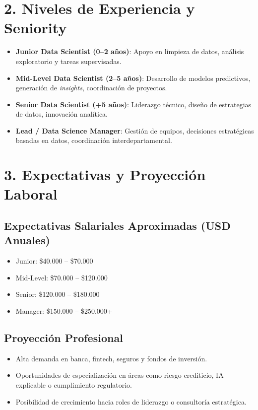 \documentclass[12pt]{article}
\begin{document}
\section*{2. Niveles de Experiencia y Seniority}

\begin{itemize}
    \item \textbf{Junior Data Scientist (0--2 años)}: Apoyo en limpieza de datos, análisis exploratorio y tareas supervisadas.
    \item \textbf{Mid-Level Data Scientist (2--5 años)}: Desarrollo de modelos predictivos, generación de \textit{insights}, coordinación de proyectos.
    \item \textbf{Senior Data Scientist (+5 años)}: Liderazgo técnico, diseño de estrategias de datos, innovación analítica.
    \item \textbf{Lead / Data Science Manager}: Gestión de equipos, decisiones estratégicas basadas en datos, coordinación interdepartamental.
\end{itemize}

\section*{3. Expectativas y Proyección Laboral}

\subsection*{Expectativas Salariales Aproximadas (USD Anuales)}
\begin{itemize}
    \item Junior: \$40.000 -- \$70.000
    \item Mid-Level: \$70.000 -- \$120.000
    \item Senior: \$120.000 -- \$180.000
    \item Manager: \$150.000 -- \$250.000+
\end{itemize}

\subsection*{Proyección Profesional}
\begin{itemize}
    \item Alta demanda en banca, fintech, seguros y fondos de inversión.
    \item Oportunidades de especialización en áreas como riesgo crediticio, IA explicable o cumplimiento regulatorio.
    \item Posibilidad de crecimiento hacia roles de liderazgo o consultoría estratégica.
\end{itemize}
\end{document}
